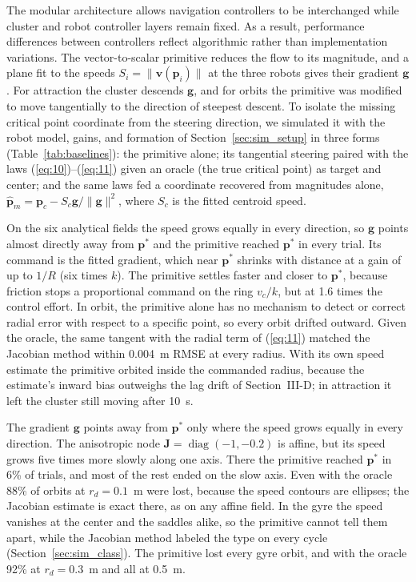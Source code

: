 \documentclass[lettersize,journal]{IEEEtran}
\newcommand{\rev}[1]{#1}
\begin{document}
The modular architecture allows navigation controllers to be interchanged while cluster and robot controller layers remain fixed. As a result, performance differences between controllers reflect algorithmic rather than implementation variations.
The vector-to-scalar primitive \cite{48} reduces the flow to its magnitude, and a plane fit to the speeds $S_i = \|\mathbf{v}(\mathbf{p}_i)\|$ at the three robots gives their gradient $\mathbf{g}$. For attraction the cluster descends $\mathbf{g}$, and for orbits the primitive was modified to move tangentially to the direction of steepest descent. To isolate the missing critical point coordinate from the steering direction, we simulated it with the robot model, gains, and formation of Section~\ref{sec:sim_setup} in three forms (Table~\ref{tab:baselines}): the primitive alone; its tangential steering paired with the laws (\ref{eq:10})--(\ref{eq:11}) given an oracle (the true critical point) as target and center; and the same laws fed a coordinate recovered from magnitudes alone, $\hat{\mathbf{p}}_m = \mathbf{p}_c - S_c\mathbf{g}/\|\mathbf{g}\|^2$, where $S_c$ is the fitted centroid speed.

On the six analytical fields the speed grows equally in every direction, so $\mathbf{g}$ points almost directly away from $\mathbf{p}^*$ and the primitive reached $\mathbf{p}^*$ in every trial. Its command is the fitted gradient, which near $\mathbf{p}^*$ shrinks with distance at a gain of up to $1/R$ (six times $k$). The primitive settles faster and closer to $\mathbf{p}^*$, because friction stops a proportional command on the ring $v_c/k$, but at \rev{1.6} times the control effort. In orbit, the primitive alone has no mechanism to detect or correct radial error with respect to a specific point, so every orbit drifted outward. Given the oracle, the same tangent with the radial term of (\ref{eq:11}) matched the Jacobian method within \rev{0.004}~m RMSE at every radius. With its own speed estimate the primitive orbited inside the commanded radius, because the estimate's inward bias outweighs the lag drift of Section~III-D; in attraction it left the cluster still moving after 10~s.

The gradient $\mathbf{g}$ points away from $\mathbf{p}^*$ only where the speed grows equally in every direction. The anisotropic node $\mathbf{J} = \operatorname{diag}(-1, -0.2)$ is affine, but its speed grows five times more slowly along one axis. There the primitive reached $\mathbf{p}^*$ in \rev{6}\% of trials, and most of the rest ended on the slow axis. Even with the oracle \rev{88}\% of orbits at $r_d = 0.1$~m were lost, because the speed contours are ellipses; the Jacobian estimate is exact there, as on any affine field. In the gyre the speed vanishes at the center and the saddles alike, so the primitive cannot tell them apart, while the Jacobian method labeled the type on every cycle (Section~\ref{sec:sim_class}). The primitive lost every gyre orbit, and with the oracle \rev{92}\% at $r_d = 0.3$~m and all at 0.5~m.
\end{document}
